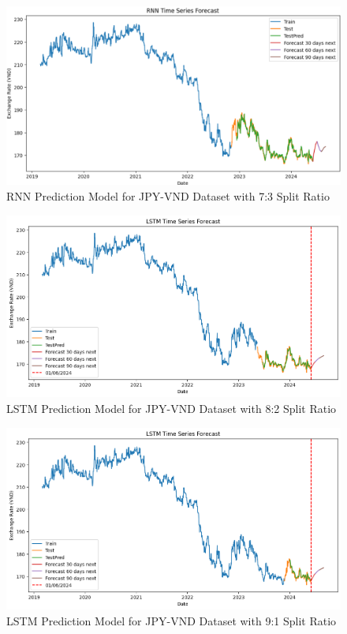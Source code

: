 \documentclass{ieeeojies}
\begin{document}
\begin{figure}[H]
  \centering
  \begin{minipage}{0.8\linewidth}
    \centering
    \includegraphics[width=\linewidth]{RNN/rnn_jpy_73.png}
    \caption{RNN Prediction Model for JPY-VND Dataset with 7:3 Split Ratio}
    \label{fig32}
  \end{minipage}
\end{figure}
\begin{figure}[H]
  \centering
  \begin{minipage}{0.8\linewidth}
    \centering
    \includegraphics[width=\linewidth]{LSTM/lstm_jpy82.png}
    \caption{LSTM Prediction Model for JPY-VND Dataset with 8:2 Split Ratio}
    \label{fig33}
  \end{minipage}
\end{figure}
\begin{figure}[H]
  \centering
  \begin{minipage}{0.8\linewidth}
    \centering
    \includegraphics[width=\linewidth]{LSTM/lstm_jpy91.png}
    \caption{LSTM Prediction Model for JPY-VND Dataset with 9:1 Split Ratio}
    \label{fig33}
  \end{minipage}
\end{figure}
\end{document}
